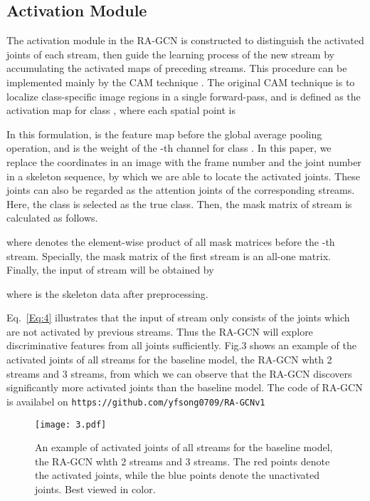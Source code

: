 \documentclass{article}
\begin{document}
\subsection{Activation Module}
\label{ssec:activation}

The activation module in the RA-GCN is constructed to distinguish the activated joints of each stream, then guide the learning process of the new stream by accumulating the activated maps of preceding streams. This procedure can be implemented mainly by the CAM technique \cite{Zhou2016}. The original CAM technique is to localize class-specific image regions in a single forward-pass, and  is defined as the activation map for class , where each spatial point is

In this formulation,  is the feature map before the global average pooling operation, and  is the weight of the -th channel for class . In this paper, we replace the coordinates  in an image with the frame number  and the joint number  in a skeleton sequence, by which we are able to locate the activated joints. These joints can also be regarded as the attention joints of the corresponding streams. Here, the class  is selected as the true class. Then, the mask matrix of stream  is calculated as follows.

where  denotes the element-wise product of all mask matrices before the -th stream. Specially, the mask matrix of the first stream is an all-one matrix. Finally, the input of stream  will be obtained by

where  is the skeleton data after preprocessing. 

Eq.~\ref{Eq:4} illustrates that the input of stream  only consists of the joints which are not activated by previous streams. Thus the RA-GCN will explore discriminative features from all joints sufficiently. Fig.3 shows an example of the activated joints of all streams for the baseline model, the RA-GCN whth 2 streams and 3 streams, from which we can observe that the RA-GCN discovers significantly more activated joints than the baseline model. The code of RA-GCN is availabel on \texttt{https://github.com/yfsong0709/RA-GCNv1}

\begin{figure}[t]
\label{fig:3}
\centerline{\texttt{[image: 3.pdf]}}
\caption{An example of activated joints of all streams for the baseline model, the RA-GCN whth 2 streams and 3 streams. The {\color{red}red} points denote the activated joints, while the {\color{blue}blue} points denote the unactivated joints. Best viewed in color.}
\vspace{-0.2cm}
\end{figure}
\end{document}
